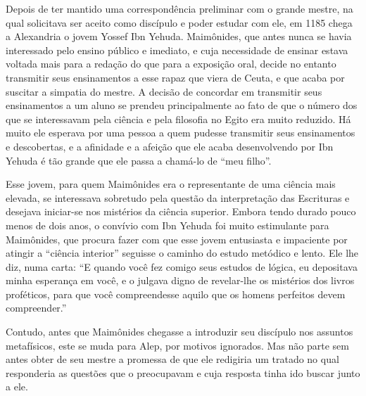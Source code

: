 Depois de ter mantido uma correspondência preliminar com o grande
mestre, na qual solicitava ser aceito como discípulo e poder estudar com
ele, em 1185 chega a Alexandria o jovem Yossef Ibn Yehuda. Maimônides,
que antes nunca se havia interessado pelo ensino público e imediato, e
cuja necessidade de ensinar estava voltada mais para a redação do que
para a exposição oral, decide no entanto transmitir seus ensinamentos a
esse rapaz que viera de Ceuta, e que acaba por suscitar a simpatia do
mestre. A decisão de concordar em transmitir seus ensinamentos a um
aluno se prendeu principalmente ao fato de que o número dos que se
interessavam pela ciência e pela filosofia no Egito era muito reduzido.
Há muito ele esperava por uma pessoa a quem pudesse transmitir seus
ensinamentos e descobertas, e a afinidade e a afeição que ele acaba
desenvolvendo por Ibn Yehuda é tão grande que ele passa a chamá-lo de
``meu filho''.

Esse jovem, para quem Maimônides era o representante de uma ciência mais
elevada, se interessava sobretudo pela questão da interpretação das
Escrituras e desejava iniciar-se nos mistérios da ciência superior.
Embora tendo durado pouco menos de dois anos, o convívio com Ibn Yehuda
foi muito estimulante para Maimônides, que procura fazer com que esse
jovem entusiasta e impaciente por atingir a ``ciência interior''
seguisse o caminho do estudo metódico e lento. Ele lhe diz, numa carta:
``E quando você fez comigo seus estudos de lógica, eu depositava minha
esperança em você, e o julgava digno de revelar-lhe os mistérios dos
livros proféticos, para que você compreendesse aquilo que os homens
perfeitos devem compreender.''

Contudo, antes que Maimônides chegasse a introduzir seu discípulo nos
assuntos metafísicos, este se muda para Alep, por motivos ignorados. Mas
não parte sem antes obter de seu mestre a promessa de que ele redigiria
um tratado no qual responderia as questões que o preocupavam e cuja
resposta tinha ido buscar junto a ele.


